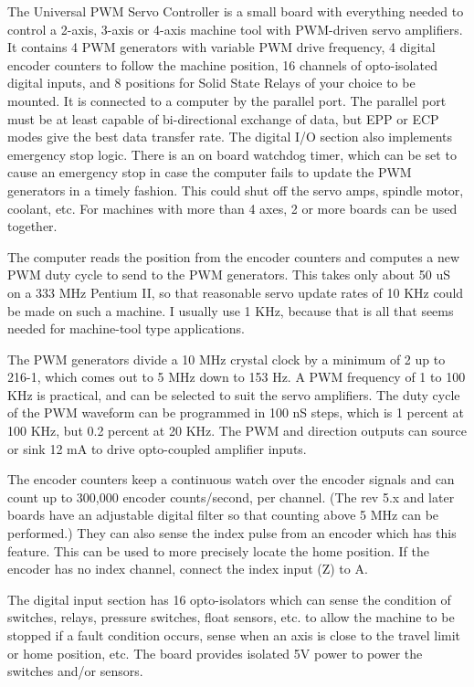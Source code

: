 The Universal PWM Servo Controller is a small board with everything needed to control a 2-axis, 3-axis or 4-axis machine tool with PWM-driven servo amplifiers. It contains 4 PWM generators with variable PWM drive frequency, 4 digital encoder counters to follow the machine position, 16 channels of opto-isolated digital inputs, and 8 positions for Solid State Relays of your choice to be mounted. It is connected to a computer by the parallel port. The parallel port must be at least capable of bi-directional exchange of data, but EPP or ECP modes give the best data transfer rate. The digital I/O section also implements emergency stop logic. There is an on board watchdog timer, which can be set to cause an emergency stop in case the computer fails to update the PWM generators in a timely fashion. This could shut off the servo amps, spindle motor, coolant, etc. For machines with more than 4 axes, 2 or more boards can be used together.
\vspace{0.5cm}

The computer reads the position from the encoder counters and computes a new PWM duty cycle to send to the PWM generators. This takes only about 50 uS on a 333 MHz Pentium II, so that reasonable servo update rates of 10 KHz could be made on such a machine. I usually use 1 KHz, because that is all that seems needed for machine-tool type applications.
\vspace{0.5cm}

The PWM generators divide a 10 MHz crystal clock by a minimum of 2 up to 216-1, which comes out to 5 MHz down to 153 Hz. A PWM frequency of 1 to 100 KHz is practical, and can be selected to suit the servo amplifiers. The duty cycle of the PWM waveform can be programmed in 100 nS steps, which is 1 percent at 100 KHz, but 0.2 percent at 20 KHz. The PWM and direction outputs can source or sink 12 mA to drive opto-coupled amplifier inputs.
\vspace{0.5cm}

The encoder counters keep a continuous watch over the encoder signals and can count up to 300,000 encoder counts/second, per channel. (The rev 5.x and later boards have an adjustable digital filter so that counting above 5 MHz can be performed.) They can also sense the index pulse from an encoder which has this feature. This can be used to more precisely locate the home position. If the encoder has no index channel, connect the index input (Z) to A.
\vspace{0.5cm}

The digital input section has 16 opto-isolators which can sense the condition of switches, relays, pressure switches, float sensors, etc. to allow the machine to be stopped if a fault condition occurs, sense when an axis is close to the travel limit or home position, etc. The board provides isolated 5V power to power the switches and/or sensors.
\vspace{0.5cm}

